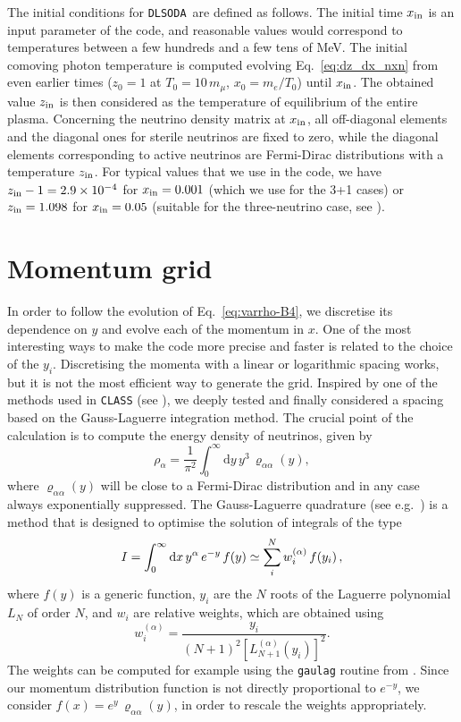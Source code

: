 \documentclass[notitlepage,showpacs,preprintnumbers,amsmath,amssymb,superscriptaddress,prd,onecolumn]{revtex4-1}
\newcommand{\e}[1]{\ensuremath{\times10^{#1}}}
\newcommand{\dlsoda}{\texttt{DLSODA}}
\begin{document}
The initial conditions for \dlsoda\ are defined as follows.
The initial time $x_{\rm in}$ is an input parameter of the code,
and reasonable values would correspond to temperatures between a few hundreds and a few tens of MeV.
The initial comoving photon temperature is computed evolving Eq.~\eqref{eq:dz_dx_nxn}
from even earlier times ($z_0=1$ at $T_0=10\, m_\mu$, $x_0=m_e/T_0$) until $x_{\rm in}$.
The obtained value $z_{\rm in}$ is then considered as the temperature of equilibrium
of the entire plasma. Concerning the neutrino density matrix at $x_{\rm in}$, all off-diagonal elements and the diagonal ones for sterile
neutrinos are fixed to zero, while the diagonal elements corresponding to active neutrinos are 
Fermi-Dirac distributions with a temperature $z_{\rm in}$.
For typical values that we use in the code,
we have $z_{\rm in}-1=2.9\e{-4}$ for $x_{\rm in}=0.001$ (which we use for the 3+1 cases)
or
$z_{\rm in} = 1.098$ for $x_{\rm in}=0.05$ (suitable for the three-neutrino case, see \cite{deSalas:2016ztq}).


\section{Momentum grid}
\label{ssec:momenta}
In order to follow the evolution of Eq.~\eqref{eq:varrho-B4}, we discretise its dependence on $y$ and evolve each of the momentum in $x$.
One of the most interesting ways to make the code more precise and faster is related to the choice of the $y_i$.
Discretising the momenta with a linear or logarithmic spacing works, but it is not the most efficient
way to generate the grid.
Inspired by one of the methods used in \texttt{CLASS} (see \cite{Lesgourgues:2011rh}),
we deeply tested and finally considered a spacing based on the Gauss-Laguerre integration method.
The crucial point of the calculation is to compute the energy density of neutrinos,
given by
%
\begin{equation}
\rho_\alpha
=
\frac{1}{\pi^2}
\int_0^\infty
\mathrm{d}y\, y^3\,\varrho_{\alpha\alpha}(y),
\end{equation}
%
where $\varrho_{\alpha\alpha}(y)$ will be close to a Fermi-Dirac distribution and in any case always exponentially suppressed.
The Gauss-Laguerre quadrature (see e.g.~\cite{NR})
is a method that is designed to optimise the solution of integrals of the type
\begin{equation}
I
=
\int_0^\infty
{\rm d}x\, y^\alpha\,e^{-y}\,f(y)
\simeq\sum_i^{N}w_i^{(\alpha)}\,f(y_i)
\,,
\end{equation}
where $f(y)$ is a generic function,
$y_i$ are the $N$ roots of the Laguerre polynomial $L_N$ of order $N$, and $w_i$ are relative weights,
 which are obtained using
\begin{equation}
w_i^{(\alpha)}=
\frac{y_i}{(N+1)^2[L^{(\alpha)}_{N+1}(y_i)]^2}.
\end{equation}
The weights can be computed for example using the \texttt{gaulag} routine from \cite{NR}.
Since our momentum distribution function is not directly proportional to $e^{-y}$,
we consider $f(x)=e^y\,\varrho_{\alpha\alpha}(y)$,
in order to rescale the weights appropriately.
\end{document}
